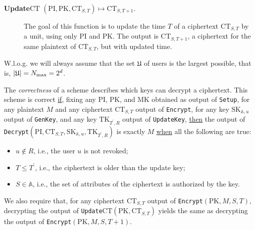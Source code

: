 \documentclass[a4paper,10pt]{article}
\newcommand{\mapssingleoutput}[2]{$ \left( #1 \right) \mapsto #2 $}
\newcommand{\singlefunction}[1]{\texttt{#1}}
\newcommand{\singlefunctiondefsingleoutput}[3]{\item[ \textbf{#1} \mapssingleoutput{#2}{#3}.\hspace{0.1em} ]}
\begin{document}
\begin{description}
		\singlefunctiondefsingleoutput{Update$\mathrm{CT}$}{\mathit{\mathrm{PI}},\mathit{\mathrm{PK}},\mathrm{CT}_{S,T}}{\mathrm{CT}_{S,T+1}}
		The goal of this function is to update the time $T$ of a ciphertext $\mathrm{CT}_{S,T}$ by a unit, using only $\mathit{\mathrm{PI}}$ and $\mathit{\mathrm{PK}}$.		
		The output is
		$\mathrm{CT}_{S,T+1}$, a ciphertext for the same plaintext of $\mathrm{CT}_{S,T}$, but with updated time.
		
\end{description}
	
	W.l.o.g. we will always assume that the set $\mathfrak{U}$ of users is the largest possible, that is, $|\mathfrak{U}|=N_{\textnormal{max}}=2^d$.
	
	The \emph{correctness} of a scheme describes which keys can decrypt a ciphertext. This scheme is correct \underline{if}, fixing any $\mathit{\mathrm{PI}}$, $\mathit{\mathrm{PK}}$, and $\mathit{\mathrm{MK}}$ obtained as output of \singlefunction{Setup}, for any plaintext $M$ and any ciphertext $\mathrm{CT}_{S,T}$ output of \singlefunction{Encrypt}, for any key $\mathit{\mathrm{SK}}_{\mathbb{A},u}$ output of \singlefunction{GenKey}, and any key $\mathit{\mathrm{TK}}_{T^{\prime},R}$ output of \singlefunction{UpdateKey}, \underline{then} the output of \singlefunction{Decrypt}$\left({\mathit{\mathrm{PI}},\mathrm{CT}_{S,T},\mathit{\mathrm{SK}}_{\mathbb{A},u},\mathit{\mathrm{TK}}_{T^{\prime}\!,R}}\right)$ is exactly $M$ \underline{when} all the following are true:
	\begin{itemize}
		\item
		$u\not\in R$, i.e., the user $u$ is not revoked;
		\item
		$T\leq T^{\prime}$, i.e., the ciphertext is older than the update key;
		\item
		$S\in\mathbb{A}$, i.e., the set of attributes of the ciphertext is authorized by the key.
	\end{itemize}
	

	We also require that, for any ciphertext $\mathrm{CT}_{S,T}$ output of \singlefunction{Encrypt}$\left({\mathit{\mathrm{PK}},M,S,T}\right)$, decrypting the output of \singlefunction{Update$\mathrm{CT}$}$({\mathit{\mathrm{PK}},\mathrm{CT}_{S,T}})$ yields the same as decrypting the output of \singlefunction{Encrypt}$(\mathit{\mathrm{PK}},M,S,T+1)$. 
\end{document}
